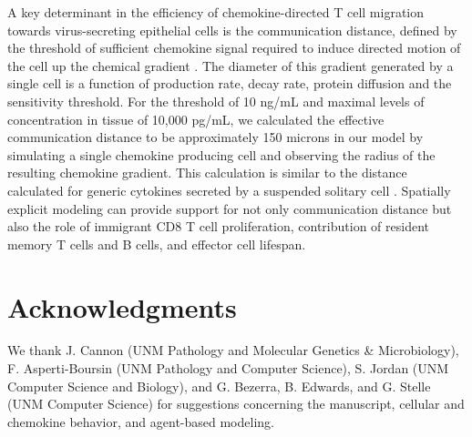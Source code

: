 \documentclass[10pt]{article}
\begin{document}
A key determinant in the efficiency of chemokine-directed T cell migration towards virus-secreting epithelial cells is the communication distance, defined by the threshold of sufficient chemokine signal required to induce directed motion of the cell up the chemical gradient \cite{Thelen2008}.  The diameter of this gradient generated by a single cell is a function of production rate, decay rate, protein diffusion and the sensitivity threshold.  For the threshold of 10 ng/mL and maximal levels of concentration in tissue of 10,000 pg/mL, we calculated the effective communication distance to be approximately 150 microns in our model by simulating a single chemokine producing cell and observing the radius of the resulting chemokine gradient.  This calculation is similar to the distance calculated for generic cytokines secreted by a suspended solitary cell \cite{Francis1997}.  Spatially explicit modeling can provide support for not only communication distance but also the role of immigrant CD8 T cell proliferation, contribution of resident memory T cells and B cells, and effector cell lifespan. 



\section*{Acknowledgments}

We thank J. Cannon (UNM Pathology and Molecular Genetics \& Microbiology), F. Asperti-Boursin (UNM Pathology and Computer Science), S. Jordan (UNM Computer Science and Biology), and G. Bezerra, B. Edwards, and G. Stelle (UNM Computer Science) for suggestions concerning the manuscript, cellular and chemokine behavior, and agent-based modeling.
\end{document}
